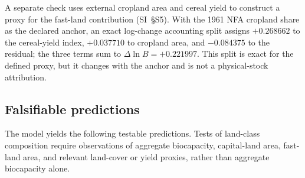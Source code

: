 \documentclass[preprint,12pt,authoryear]{elsarticle}
\begin{document}
A separate check uses external cropland area and cereal yield to construct a proxy for the fast-land contribution (SI~\S S5). With the 1961 NFA cropland share as the declared anchor, an exact log-change accounting split assigns $+0.268662$ to the cereal-yield index, $+0.037710$ to cropland area, and $-0.084375$ to the residual; the three terms sum to $\Delta\ln B=+0.221997$. This split is exact for the defined proxy, but it changes with the anchor and is not a physical-stock attribution.

\subsection{Falsifiable predictions}\label{sec:predictions}

The model yields the following testable predictions. Tests of land-class composition require observations of aggregate biocapacity, capital-land area, fast-land area, and relevant land-cover or yield proxies, rather than aggregate biocapacity alone.
\end{document}
